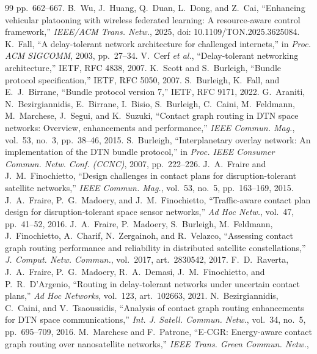 \documentclass[twocolumn,3p,times,procedia]{elsarticle}
\begin{document}
\begin{thebibliography}{99}
pp.~662--667.
B.~Wu, J.~Huang, Q.~Duan, L.~Dong, and Z.~Cai, ``Enhancing vehicular
platooning with wireless federated learning: A resource-aware control
framework,'' \emph{IEEE/ACM Trans. Netw.}, 2025, doi:
10.1109/TON.2025.3625084.
K.~Fall, ``A delay-tolerant network architecture for challenged
internets,'' in \emph{Proc. ACM SIGCOMM}, 2003, pp.~27--34.
V.~Cerf \emph{et al.}, ``Delay-tolerant networking architecture,'' IETF,
RFC 4838, 2007.
K.~Scott and S.~Burleigh, ``Bundle protocol specification,'' IETF, RFC
5050, 2007.
S.~Burleigh, K.~Fall, and E.~J.~Birrane, ``Bundle protocol version 7,''
IETF, RFC 9171, 2022.
G.~Araniti, N.~Bezirgiannidis, E.~Birrane, I.~Bisio, S.~Burleigh,
C.~Caini, M.~Feldmann, M.~Marchese, J.~Segui, and K.~Suzuki, ``Contact
graph routing in DTN space networks: Overview, enhancements and
performance,'' \emph{IEEE Commun. Mag.}, vol.~53, no.~3, pp.~38--46, 2015.
S.~Burleigh, ``Interplanetary overlay network: An implementation of the
DTN bundle protocol,'' in \emph{Proc. IEEE Consumer Commun. Netw. Conf.
(CCNC)}, 2007, pp.~222--226.
J.~A.~Fraire and J.~M.~Finochietto, ``Design challenges in contact plans
for disruption-tolerant satellite networks,'' \emph{IEEE Commun. Mag.},
vol.~53, no.~5, pp.~163--169, 2015.
J.~A.~Fraire, P.~G.~Madoery, and J.~M.~Finochietto, ``Traffic-aware contact
plan design for disruption-tolerant space sensor networks,'' \emph{Ad Hoc
Netw.}, vol.~47, pp.~41--52, 2016.
J.~A.~Fraire, P.~Madoery, S.~Burleigh, M.~Feldmann, J.~Finochietto,
A.~Charif, N.~Zergainoh, and R.~Velazco, ``Assessing contact graph routing
performance and reliability in distributed satellite constellations,''
\emph{J. Comput. Netw. Commun.}, vol.~2017, art.~2830542, 2017.
F.~D.~Raverta, J.~A.~Fraire, P.~G.~Madoery, R.~A.~Demasi,
J.~M.~Finochietto, and P.~R.~D'Argenio, ``Routing in delay-tolerant
networks under uncertain contact plans,'' \emph{Ad Hoc Networks},
vol.~123, art.~102663, 2021.
N.~Bezirgiannidis, C.~Caini, and V.~Tsaoussidis, ``Analysis of contact
graph routing enhancements for DTN space communications,'' \emph{Int. J.
Satell. Commun. Netw.}, vol.~34, no.~5, pp.~695--709, 2016.
M.~Marchese and F.~Patrone, ``E-CGR: Energy-aware contact graph routing
over nanosatellite networks,'' \emph{IEEE Trans. Green Commun. Netw.},

\end{thebibliography}
\end{document}
